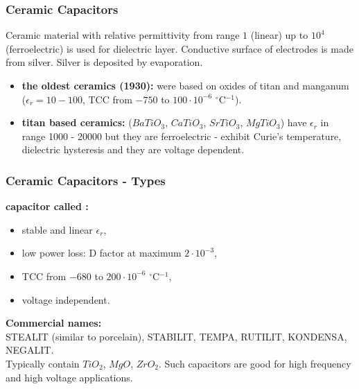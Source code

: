 \documentclass{beamer}
\begin{document}
	\begin{frame}
    \frametitle{Ceramic Capacitors}
		Ceramic material with relative permittivity from range $1$ (linear) up to $10^4$ (ferroelectric) is used for dielectric layer. Conductive surface of electrodes is made from silver. Silver is deposited by evaporation.
		
		\begin{itemize}
			\item \textbf{the oldest ceramics (1930):} were based on oxides of titan and manganum \\($\epsilon_r=10-100$, TCC from $-750$ to $100\cdot 10^{-6}$ $^\circ$C$^{-1}$).
			\item \textbf{titan based ceramics:} ($BaTiO_3$, $CaTiO_3$, $SrTiO_3$, $MgTiO_3$) have $\epsilon_r$ in range 1000 - 20000 but they are ferroelectric - exhibit Curie's temperature, dielectric hysteresis and they are voltage dependent.
		\end{itemize}
  \end{frame}
	\begin{frame}
    \frametitle{Ceramic Capacitors - Types}
		\textbf{capacitor called : }
		\begin{itemize}
			\item stable and linear $\epsilon_r$,
			\item low power loss: D factor at maximum $2\cdot 10^{-3}$,
			\item TCC from $-680$ to $200\cdot 10^{-6}$ $^\circ$C$^{-1}$,
			\item voltage independent.
		\end{itemize}
		\small
		\textbf{Commercial names:} \\STEALIT (similar to porcelain), STABILIT, TEMPA, RUTILIT, KONDENSA, NEGALIT. \\Typically contain $TiO_2$, $MgO$, $ZrO_2$. Such capacitors are good for high frequency and high voltage applications.

  \end{frame}
\end{document}
